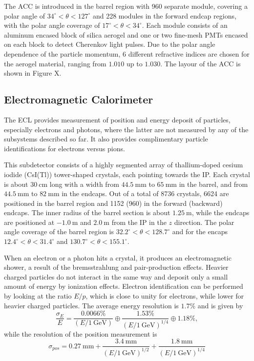 \documentclass[headings=standardclasses,headings=big,oneside,a4paper,openany,12pt]{scrbook}
\newcommand {\e}[1]{\mathrm{~#1}}
\begin{document}
The ACC is introduced in the barrel region with 960 separate module, covering a polar angle of $34^\circ < \theta < 127^\circ$ and 228 modules in the forward endcap regions, with the polar angle coverage of $17^\circ < \theta < 34^\circ$. Each module consists of an aluminum encased block of silica aerogel and one or two fine-mesh PMTs encased on each block to detect Cherenkov light pulses. Due to the polar angle dependence of the particle momentum, 6 different refractive indices are chosen for the aerogel material, ranging from $1.010$ up to $1.030$. The layour of the ACC is shown in Figure X.


\subsection{Electromagnetic Calorimeter}
The ECL provides measurement of position and energy deposit of particles, especially electrons and photons, where the latter are not measured by any of the subsystems described so far. It also provides complimentary particle identifications for electrons versus pions.

This subdetector consists of a highly segmented array of thallium-doped cesium iodide (CsI(Tl)) tower-shaped crystals, each pointing towards the IP. Each crystal is about $30\e{cm}$ long with a width from $44.5\e{mm}$ to $65\e{mm}$ in the barrel, and from $44.5\e{mm}$ to $82\e{mm}$ in the endcaps. Out of a total of 8736 crystals, 6624 are positioned in the barrel region and 1152 (960) in the forward (backward) endcaps. The inner radius of the barrel section is about $1.25\e{m}$, while the endcaps are positioned at $-1.0\e{m}$ and $2.0\e{m}$ from the IP in the $z$ direction. The polar angle coverage of the barrel region is $32.2^\circ < \theta < 128.7^\circ$ and for the encaps $12.4^\circ < \theta < 31.4^\circ$ and $130.7^\circ < \theta < 155.1^\circ$.

When an electron or a photon hits a crystal, it produces an electromagnetic shower, a result of the bremsstrahlung and pair-production effects. Heavier charged particles do not interact in the same way and deposit only a small amount of energy by ionization effects. Electron identification can be performed by looking at the ratio $E/p$, which is close to unity for electrons, while lower for heavier charged particles. The average energy resolution is $1.7\%$ and is given by
\begin{equation}
\frac{\sigma_E}{E} = \frac{0.0066\%}{\left(E/1\e{GeV}\right)}\oplus\frac{1.53\%}{\left( E/1\e{GeV}\right)^{1/4}}\oplus 1.18\%,
\end{equation}
while the resolution of the position measurement is
\begin{equation}
\sigma_{pos} = 0.27\e{mm}+\frac{3.4\e{mm}}{\left( E/1\e{GeV}\right)^{1/2}} + \frac{1.8\e{mm}}{\left( E/1\e{GeV}\right)^{1/4}}
\end{equation}
\end{document}
